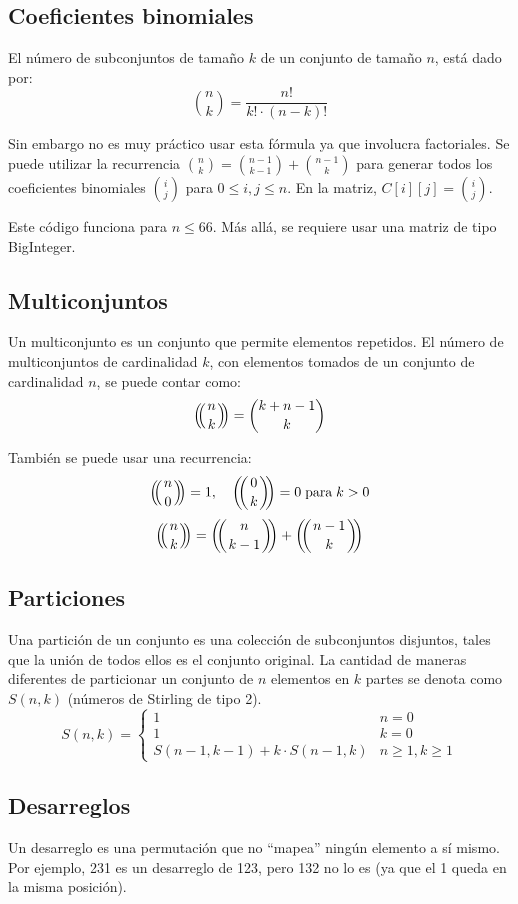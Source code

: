 \documentclass{article}
\def\multiset#1#2{\ensuremath{\left(\kern-.3em\left(\genfrac{}{}{0pt}{}{#1}{#2}\right)\kern-.3em\right)}}
\begin{document}
\begin{multicols}{2}
	\subsection{Coeficientes binomiales}
	El número de subconjuntos de tamaño \( k \) de un conjunto de tamaño \( n \), está dado por:
	\[ 
		\binom{n}{k} = \frac{n!}{k! \cdot (n-k)!} 
	\]

	Sin embargo no es muy práctico usar esta fórmula ya que involucra factoriales. Se puede utilizar la recurrencia \( \binom{n}{k} = \binom{n-1}{k-1} + \binom{n-1}{k} \) para generar todos los coeficientes binomiales \( \binom{i}{j} \) para \( 0 \leq i,j \leq n \). En la matriz, \( C[i][j] = \binom{i}{j} \).

	

	 Este código funciona para \( n \leq 66 \). Más allá, se requiere usar una matriz de tipo BigInteger.

	\subsection{Multiconjuntos}
	Un multiconjunto es un conjunto que permite elementos repetidos. El número de multiconjuntos de cardinalidad \( k \), con elementos tomados de un conjunto de cardinalidad \( n \), se puede contar como:
	\[ \multiset{n}{k} = \binom{k+n-1}{k} \]

	También se puede usar una recurrencia:
	\[ 
		\multiset{n}{0} = 1, \quad \multiset{0}{k} = 0 \; \textrm{para} \; k > 0 
	\]
	\[ 
		\multiset{n}{k} = \multiset{n}{k-1} + \multiset{n-1}{k} 
	\]

\subsection{Particiones}
	Una partición de un conjunto es una colección de subconjuntos disjuntos, tales que la unión de todos ellos es el conjunto original. La cantidad de maneras diferentes de particionar un conjunto de \( n \) elementos en \( k \) partes se denota como \( S(n, k) \) (números de Stirling de tipo 2).
	\[
		S(n,k) = \left \{ 
			\begin{array}{lcc}
			1 & n = 0
			\\ 1 & k = 0
			\\ S(n-1, k-1) + k \cdot S(n-1, k) & n \geq 1, k \geq 1
			\end{array}
		\right.
	\]

	\subsection{Desarreglos}
	Un desarreglo es una permutación que no ``mapea'' ningún elemento a sí mismo. Por ejemplo, 231 es un desarreglo de 123, pero 132 no lo es (ya que el 1 queda en la misma posición).


\end{multicols}
\end{document}

